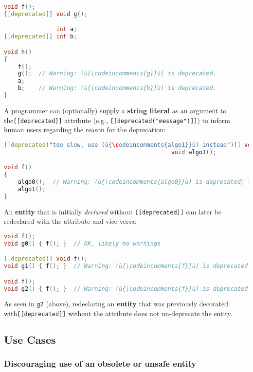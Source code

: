 \begin{lstlisting}[language=C++]
               void f();
[[deprecated]] void g();

               int a;
[[deprecated]] int b;

void h()
{
    f();
    g();  // Warning: (ù{\codeincomments{g}}ù) is deprecated.
    a;
    b;    // Warning: (ù{\codeincomments{b}}ù) is deprecated.
}
\end{lstlisting}

\noindent A programmer can (optionally) supply a \textbf{string literal} as an
argument to the\linebreak[4] \mbox{\texttt{[[deprecated]]}} attribute (e.g.,
\mbox{\texttt{[[deprecated("message")]]}}) to inform human users regarding the
reason for the deprecation:

\begin{lstlisting}[language=C++]
[[deprecated("too slow, use (ù{\codeincomments{algo1}}ù) instead")]] void algo0();
                                                void algo1();

void f()
{
    algo0();  // Warning: (ù{\codeincomments{algo0}}ù) is deprecated; too slow, use (ù{\codeincomments{algo1}}ù) instead.
    algo1();
}
\end{lstlisting}

\noindent An \textbf{entity} that is initially \emph{declared} without
\texttt{[[deprecated]]} can later be redeclared with the attribute and
vice versa:

\begin{lstlisting}[language=C++]
void f();
void g0() { f(); }  // OK, likely no warnings

[[deprecated]] void f();
void g1() { f(); }  // Warning: (ù{\codeincomments{f}}ù) is deprecated.

void f();
void g2() { f(); }  // Warning: (ù{\codeincomments{f}}ù) is deprecated (still).
\end{lstlisting}

\noindent As seen in \texttt{g2} (above), redeclaring an \textbf{entity} that was
previously decorated with\linebreak[4] \mbox{\texttt{[[deprecated]]}} without the attribute
does not un-deprecate the entity.

\subsection[Use Cases]{Use Cases}\label{use-cases}

\subsubsection[Discouraging use of an obsolete or unsafe \textbf{entity}]{Discouraging use of an obsolete or unsafe \textbf{entity}}\label{discouraging-use-of-an-obsolete-or-unsafe-entity}

